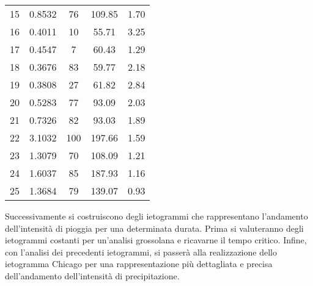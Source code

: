 \begin{table}[htb]
\begin{tabular}{cS[table-format=1.4]S[table-format=3.0]S[table-format=3.2]S[table-format=1.2]}
15       & 0.8532      & 76                & 109.85              & 1.70           \\
16       & 0.4011      & 10                & 55.71               & 3.25           \\
17       & 0.4547      & 7                 & 60.43               & 1.29           \\
18       & 0.3676      & 83                & 59.77               & 2.18           \\
19       & 0.3808      & 27                & 61.82               & 2.84           \\
20       & 0.5283      & 77                & 93.09               & 2.03           \\
21       & 0.7326      & 82                & 93.03               & 1.89           \\
22       & 3.1032      & 100               & 197.66              & 1.59           \\
23       & 1.3079      & 70                & 108.09              & 1.21           \\
24       & 1.6037      & 85                & 187.93              & 1.16           \\
25       & 1.3684      & 79                & 139.07              & 0.93           \\ \bottomrule
\end{tabular}
\end{table}

Successivamente si costruiscono degli ietogrammi che rappresentano l'andamento dell'intensità di pioggia per una determinata durata. 
Prima si valuteranno degli ietogrammi costanti per un'analisi grossolana e  ricavarne il tempo critico.
Infine, con l'analisi dei precedenti ietogrammi, si passerà alla realizzazione dello ietogramma Chicago per una rappresentazione più dettagliata e precisa dell'andamento dell'intensità di precipitazione.


